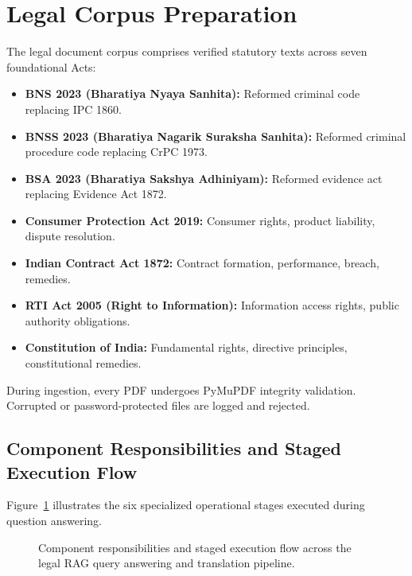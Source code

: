 \documentclass[12pt,a4paper]{report}
\begin{document}
\section{Legal Corpus Preparation}
The legal document corpus comprises verified statutory texts across seven foundational Acts:
\begin{itemize}
    \item \textbf{BNS 2023 (Bharatiya Nyaya Sanhita):} Reformed criminal code replacing IPC 1860.
    \item \textbf{BNSS 2023 (Bharatiya Nagarik Suraksha Sanhita):} Reformed criminal procedure code replacing CrPC 1973.
    \item \textbf{BSA 2023 (Bharatiya Sakshya Adhiniyam):} Reformed evidence act replacing Evidence Act 1872.
    \item \textbf{Consumer Protection Act 2019:} Consumer rights, product liability, dispute resolution.
    \item \textbf{Indian Contract Act 1872:} Contract formation, performance, breach, remedies.
    \item \textbf{RTI Act 2005 (Right to Information):} Information access rights, public authority obligations.
    \item \textbf{Constitution of India:} Fundamental rights, directive principles, constitutional remedies.
\end{itemize}

During ingestion, every PDF undergoes PyMuPDF integrity validation. Corrupted or password-protected files are logged and rejected.

\subsection{Component Responsibilities and Staged Execution Flow}
Figure~\ref{fig:ml_inference_flow} illustrates the six specialized operational stages executed during question answering.

\begin{figure}[H]
    \centering
    \caption{Component responsibilities and staged execution flow across the legal RAG query answering and translation pipeline.}
    \label{fig:ml_inference_flow}
\end{figure}
\end{document}
